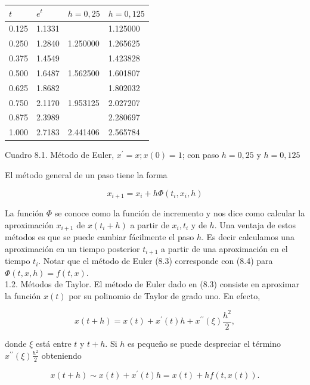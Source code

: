 \documentclass[10pt]{book}
\begin{document}
\begin{center}
\begin{tabular}{|l|l|l|l|}
\hline
$t$ & $e^{t}$ & $h=0,25$ & $h=0,125$ \\
\hline
0.125 & 1.1331 &  & 1.125000 \\
0.250 & 1.2840 & 1.250000 & 1.265625 \\
0.375 & 1.4549 &  & 1.423828 \\
0.500 & 1.6487 & 1.562500 & 1.601807 \\
0.625 & 1.8682 &  & 1.802032 \\
0.750 & 2.1170 & 1.953125 & 2.027207 \\
0.875 & 2.3989 &  & 2.280697 \\
1.000 & 2.7183 & 2.441406 & 2.565784 \\
\hline
\end{tabular}
\end{center}

Cuadro 8.1. Método de Euler, $x^{\prime}=x ; x(0)=1$; con paso $h=0,25$ y $h=0,125$

El método general de un paso tiene la forma


\begin{equation*}
x_{i+1}=x_{i}+h \Phi\left(t_{i}, x_{i}, h\right) \tag{8.4}
\end{equation*}


La función $\Phi$ se conoce como la función de incremento y nos dice como calcular la aproximación $x_{i+1}$ de $x\left(t_{i}+h\right)$ a partir de $x_{i}, t_{i}$ y de $h$. Una ventaja de estos métodos es que se puede cambiar fácilmente el paso $h$. Es decir calculamos una aproximación en un tiempo posterior $t_{i+1}$ a partir de una aproximación en el tiempo $t_{i}$. Notar que el método de Euler (8.3) corresponde con (8.4) para $\Phi(t, x, h)=f(t, x)$.\\
1.2. Métodos de Taylor. El método de Euler dado en (8.3) consiste en aproximar la función $x(t)$ por su polinomio de Taylor de grado uno. En efecto,

$$
x(t+h)=x(t)+x^{\prime}(t) h+x^{\prime \prime}(\xi) \frac{h^{2}}{2},
$$

donde $\xi$ está entre $t$ y $t+h$. Si $h$ es pequeño se puede despreciar el término $x^{\prime \prime}(\xi) \frac{h^{2}}{2}$ obteniendo


\begin{equation*}
x(t+h) \sim x(t)+x^{\prime}(t) h=x(t)+h f(t, x(t)) . \tag{8.5}
\end{equation*}
\end{document}
